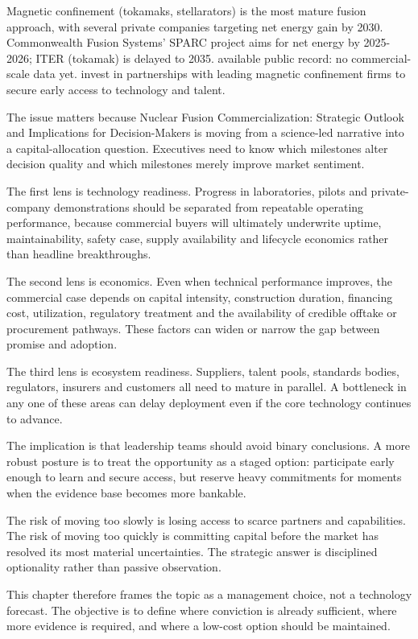 \documentclass[10pt,a4paper]{article}
\begin{document}
{\small Magnetic confinement (tokamaks, stellarators) is the most mature fusion approach, with several private companies targeting net energy gain by 2030. Commonwealth Fusion Systems' SPARC project aims for net energy by 2025-2026; ITER (tokamak) is delayed to 2035. available public record: no commercial-scale data yet. invest in partnerships with leading magnetic confinement firms to secure early access to technology and talent.}\par
{\small The issue matters because Nuclear Fusion Commercialization: Strategic Outlook and Implications for Decision-Makers is moving from a science-led narrative into a capital-allocation question. Executives need to know which milestones alter decision quality and which milestones merely improve market sentiment.}\par
{\small The first lens is technology readiness. Progress in laboratories, pilots and private-company demonstrations should be separated from repeatable operating performance, because commercial buyers will ultimately underwrite uptime, maintainability, safety case, supply availability and lifecycle economics rather than headline breakthroughs.}\par
{\small The second lens is economics. Even when technical performance improves, the commercial case depends on capital intensity, construction duration, financing cost, utilization, regulatory treatment and the availability of credible offtake or procurement pathways. These factors can widen or narrow the gap between promise and adoption.}\par
{\small The third lens is ecosystem readiness. Suppliers, talent pools, standards bodies, regulators, insurers and customers all need to mature in parallel. A bottleneck in any one of these areas can delay deployment even if the core technology continues to advance.}\par
{\small The implication is that leadership teams should avoid binary conclusions. A more robust posture is to treat the opportunity as a staged option: participate early enough to learn and secure access, but reserve heavy commitments for moments when the evidence base becomes more bankable.}\par
{\small The risk of moving too slowly is losing access to scarce partners and capabilities. The risk of moving too quickly is committing capital before the market has resolved its most material uncertainties. The strategic answer is disciplined optionality rather than passive observation.}\par
{\small This chapter therefore frames the topic as a management choice, not a technology forecast. The objective is to define where conviction is already sufficient, where more evidence is required, and where a low-cost option should be maintained.}\par
\label{chap:2:end}
\end{document}

